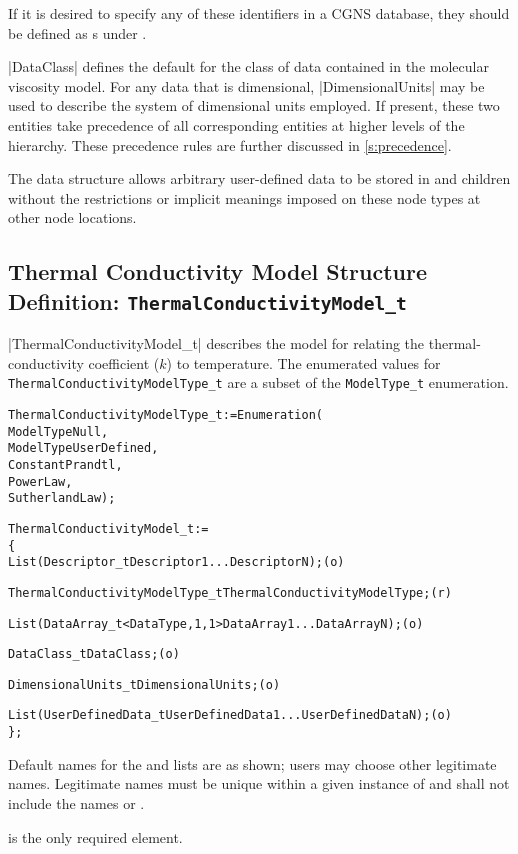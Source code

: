 If it is desired to specify any of these identifiers in a CGNS
database, they should be defined as s under
.

|DataClass| defines the default for the class of data contained in the
molecular viscosity model.
For any data that is dimensional, |DimensionalUnits| may be used to
describe the system of dimensional units employed.
If present, these two entities take precedence of all corresponding
entities at higher levels of the hierarchy.
These precedence rules are further discussed in \autoref{s:precedence}.

The  data structure allows arbitrary
user-defined data to be stored in  and
 children without the restrictions or implicit
meanings imposed on these node types at other node locations.

\subsection{Thermal Conductivity Model Structure Definition: \texttt{ThermalConductivityModel\_t}} 

|ThermalConductivityModel_t| describes the model for relating the
thermal-conductivity coefficient ($k$) to temperature.
The enumerated values for \texttt{ThermalConductivityModelType\_t} are a subset of the
\texttt{ModelType\_t} enumeration.
\begin{alltt}
  ThermalConductivityModelType\_t := Enumeration(
    ModelTypeNull,
    ModelTypeUserDefined,
    ConstantPrandtl,
    PowerLaw,
    SutherlandLaw ) ;

  ThermalConductivityModel\_t :=
    \{
    List( Descriptor\_t Descriptor1 ... DescriptorN ) ;                      (o)

    ThermalConductivityModelType\_t ThermalConductivityModelType ;           (r)
    
    List( DataArray\_t<DataType, 1, 1> DataArray1 ... DataArrayN ) ;         (o)

    DataClass\_t DataClass ;                                                 (o)
                
    DimensionalUnits\_t DimensionalUnits ;                                   (o)

    List( UserDefinedData\_t UserDefinedData1 ... UserDefinedDataN ) ;       (o)
    \} ;
\end{alltt}

\begin{notes}
\item
 Default names for the  and 
 lists are as shown; users may choose other legitimate names.
 Legitimate names must be unique within a given instance of
  and shall not include the names
  or .
\item
  is the only required element.
\end{notes}

